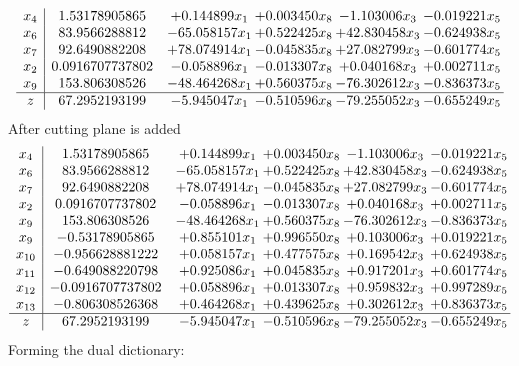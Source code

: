 \documentclass[11pt]{article}
\begin{document}
\[\begin{array}{c| c c@{\hskip 2pt} c@{\hskip 2pt} c@{\hskip 2pt} c@{\hskip 2pt} }
 x_{4}   &  1.53178905865 & + 0.144899 x_{1} & + 0.003450 x_{8} & -1.103006 x_{3} & -0.019221 x_{5}\\
 x_{6}   &  83.9566288812 & -65.058157 x_{1} & + 0.522425 x_{8} & + 42.830458 x_{3} & -0.624938 x_{5}\\
 x_{7}   &  92.6490882208 & + 78.074914 x_{1} & -0.045835 x_{8} & + 27.082799 x_{3} & -0.601774 x_{5}\\
 x_{2}   &  0.0916707737802 & -0.058896 x_{1} & -0.013307 x_{8} & + 0.040168 x_{3} & + 0.002711 x_{5}\\
 x_{9}   &  153.806308526 & -48.464268 x_{1} & + 0.560375 x_{8} & -76.302612 x_{3} & -0.836373 x_{5}\\
\hline
z    &  67.2952193199 & -5.945047 x_{1} & -0.510596 x_{8} & -79.255052 x_{3} & -0.655249 x_{5}\\
\end{array}\]
 After cutting plane is added 
\[\begin{array}{c| c c@{\hskip 2pt} c@{\hskip 2pt} c@{\hskip 2pt} c@{\hskip 2pt} }
 x_{4}   &  1.53178905865 & + 0.144899 x_{1} & + 0.003450 x_{8} & -1.103006 x_{3} & -0.019221 x_{5}\\
 x_{6}   &  83.9566288812 & -65.058157 x_{1} & + 0.522425 x_{8} & + 42.830458 x_{3} & -0.624938 x_{5}\\
 x_{7}   &  92.6490882208 & + 78.074914 x_{1} & -0.045835 x_{8} & + 27.082799 x_{3} & -0.601774 x_{5}\\
 x_{2}   &  0.0916707737802 & -0.058896 x_{1} & -0.013307 x_{8} & + 0.040168 x_{3} & + 0.002711 x_{5}\\
 x_{9}   &  153.806308526 & -48.464268 x_{1} & + 0.560375 x_{8} & -76.302612 x_{3} & -0.836373 x_{5}\\
 x_{9}   &  -0.53178905865 & + 0.855101 x_{1} & + 0.996550 x_{8} & + 0.103006 x_{3} & + 0.019221 x_{5}\\
 x_{10}   &  -0.956628881222 & + 0.058157 x_{1} & + 0.477575 x_{8} & + 0.169542 x_{3} & + 0.624938 x_{5}\\
 x_{11}   &  -0.649088220798 & + 0.925086 x_{1} & + 0.045835 x_{8} & + 0.917201 x_{3} & + 0.601774 x_{5}\\
 x_{12}   &  -0.0916707737802 & + 0.058896 x_{1} & + 0.013307 x_{8} & + 0.959832 x_{3} & + 0.997289 x_{5}\\
 x_{13}   &  -0.806308526368 & + 0.464268 x_{1} & + 0.439625 x_{8} & + 0.302612 x_{3} & + 0.836373 x_{5}\\
\hline
z    &  67.2952193199 & -5.945047 x_{1} & -0.510596 x_{8} & -79.255052 x_{3} & -0.655249 x_{5}\\
\end{array}\]
Forming the dual dictionary:
\end{document}
